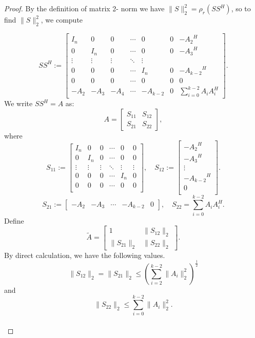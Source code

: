 \documentclass [12pt]{article}
\begin{document}
\begin{proof} By the definition of matrix 2- norm we have $\|S\|_{2}^{2}=\rho_{r}(SS^{H})$, so to find $\|S\|^{2}_{2}$, we compute

     \[
SS^{H}:= 
\begin{bmatrix}
I_{n} &0 & 0 & \cdots & 0& 0& -{A_{2}}^{H}\\
0 & I_{n} &0& \cdots &0 &0& {-A_{3}}^{H} \\
\vdots & \vdots & \vdots & \ddots & \vdots \\
0 & 0 & 0 & \cdots & I_n &0& {-A_{k-2}}^{H}\\
0 & 0 & 0 & \cdots & 0 &0 &0\\
-A_2 & -A_3 & -A_4 & \cdots & -A_{k-2}&0& \sum_{i=0}^{k-2} A_{i}A_{i}^{H}
\end{bmatrix}.
\] We write $SS^{H}=A$ as: 
\[
    A = \begin{bmatrix}
        S_{11} & S_{12} \\
        S_{21} & S_{22}
    \end{bmatrix},
    \]
where \[
S_{11} := 
\begin{bmatrix}
I_{n} &0 & 0 & \cdots & 0&0\\
0 & I_{n} &0& \cdots &0 &0  \\
\vdots & \vdots & \vdots & \ddots & \vdots&\vdots \\
0 & 0 & 0 & \cdots & I_n&0 \\
0 & 0 & 0 & \cdots & 0 &0\\
\end{bmatrix},
\quad S_{12} := 
\begin{bmatrix}
-{A_{2}}^{H}\\
{-A_{3}}^{H} \\
\vdots \\ {-A_{k-2}}^{H}\\0\\
\end{bmatrix}. \]          
\[S_{21} := \begin{bmatrix}
    -A_2 &-A_3&\cdots& -A_{k-2} &0
\end{bmatrix},\quad 
S_{22}=\sum_{i=0}^{k-2}A_{i}A_{i}^{H}.\]
Define
\[
\tilde{A} = \begin{bmatrix}1 & \|S_{12}\|_{2} \\ \|S_{21}\|_2 & \|S_{22}\|_2 \end{bmatrix}.
\]
By direct calculation, we have the following values.\\ 
$$\|S_{12}\|_{2}=\|S_{21}\|_{2}\le \left(\sum_{i=2}^{k-2}\|A_{i}\|_{2}^{2}\right)^\frac{1}{2}$$ and $$\|S_{22}\|_{2} \le  \sum_{i=0}^{k-2}\|A_{i}\|_{2}^{2}.$$\\

\end{proof}
\end{document}
